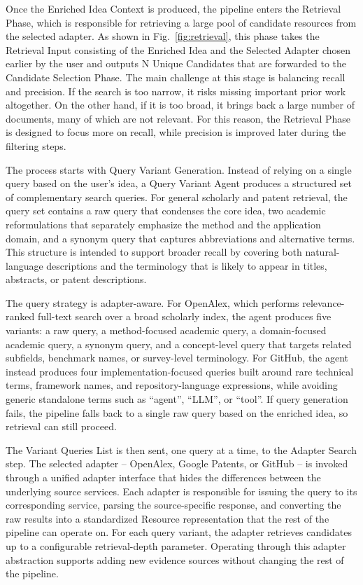 Once the Enriched Idea Context is produced, the pipeline enters the Retrieval Phase, which is responsible for retrieving a large pool of candidate resources from the selected adapter. As shown in Fig.~\ref{fig:retrieval}, this phase takes the Retrieval Input consisting of the Enriched Idea and the Selected Adapter chosen earlier by the user and outputs N Unique Candidates that are forwarded to the Candidate Selection Phase. The main challenge at this stage is balancing recall and precision. If the search is too narrow, it risks missing important prior work altogether. On the other hand, if it is too broad, it brings back a large number of documents, many of which are not relevant. For this reason, the Retrieval Phase is designed to focus more on recall, while precision is improved later during the filtering steps.

The process starts with Query Variant Generation. Instead of relying on a single query based on the user's idea, a Query Variant Agent produces a structured set of complementary search queries. For general scholarly and patent retrieval, the query set contains a raw query that condenses the core idea, two academic reformulations that separately emphasize the method and the application domain, and a synonym query that captures abbreviations and alternative terms. This structure is intended to support broader recall by covering both natural-language descriptions and the terminology that is likely to appear in titles, abstracts, or patent descriptions.

The query strategy is adapter-aware. For OpenAlex, which performs relevance-ranked full-text search over a broad scholarly index, the agent produces five variants: a raw query, a method-focused academic query, a domain-focused academic query, a synonym query, and a concept-level query that targets related subfields, benchmark names, or survey-level terminology. For GitHub, the agent instead produces four implementation-focused queries built around rare technical terms, framework names, and repository-language expressions, while avoiding generic standalone terms such as ``agent'', ``LLM'', or ``tool''. If query generation fails, the pipeline falls back to a single raw query based on the enriched idea, so retrieval can still proceed.

The Variant Queries List is then sent, one query at a time, to the Adapter Search step. The selected adapter -- OpenAlex, Google Patents, or GitHub -- is invoked through a unified adapter interface that hides the differences between the underlying source services. Each adapter is responsible for issuing the query to its corresponding service, parsing the source-specific response, and converting the raw results into a standardized Resource representation that the rest of the pipeline can operate on. For each query variant, the adapter retrieves candidates up to a configurable retrieval-depth parameter. Operating through this adapter abstraction supports adding new evidence sources without changing the rest of the pipeline.


